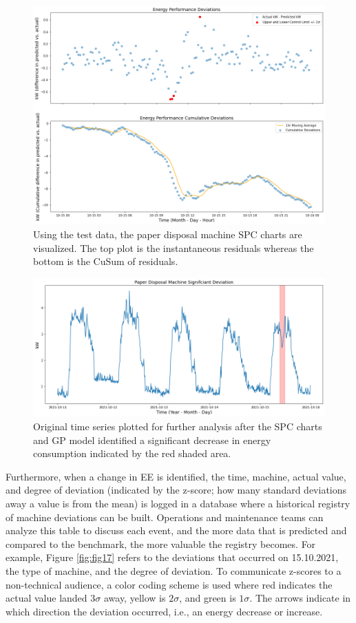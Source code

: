 \begin{figure}[h]
\centering
\graphicspath{ {./images/} }
\includegraphics[scale=0.49]{images/entsorgung_test_SPC.png}
\caption{Using the test data, the paper disposal machine SPC charts are visualized. The top plot is the instantaneous residuals whereas the bottom is the CuSum of residuals.}
\label{fig:fig15}
\end{figure}

\begin{figure}[h]
\centering
\graphicspath{ {./images/} }
\includegraphics[scale=0.49]{images/entsorgung_deviation.png}
\caption{Original time series plotted for further analysis after the SPC charts and GP model identified a significant decrease in energy consumption indicated by the red shaded area.}
\label{fig:fig16}
\end{figure}

Furthermore, when a change in EE is identified, the time, machine, actual value, and degree of deviation (indicated by the z-score; how many standard deviations away a value is from the mean) is logged in a database where a historical registry of machine deviations can be built. Operations and maintenance teams can analyze this table to discuss each event, and the more data that is predicted and compared to the benchmark, the more valuable the registry becomes. For example, Figure \ref{fig:fig17} refers to the deviations that occurred on 15.10.2021, the type of machine, and the degree of deviation. To communicate z-scores to a non-technical audience, a color coding scheme is used where red indicates the actual value landed $3\sigma$ away, yellow is $2\sigma$, and green is $1\sigma$. The arrows indicate in which direction the deviation occurred, i.e., an energy decrease or increase.

